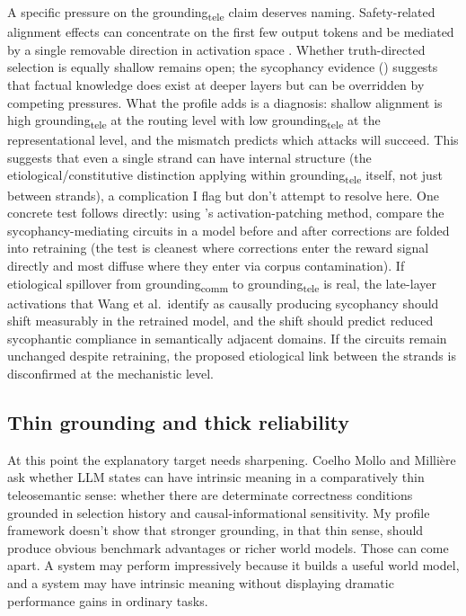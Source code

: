 \documentclass[12pt]{article}
\newcommand{\gtele}{grounding\textsubscript{tele}}
\newcommand{\gcomm}{grounding\textsubscript{comm}}
\begin{document}
A specific pressure on the \gtele{} claim deserves naming. Safety-related alignment effects can concentrate on the first few output tokens and be mediated by a single removable direction in activation space \citep{qi_2025_shallow_safety_alignment,arditi_2024_refusal_single_direction}. Whether truth-directed selection is equally shallow remains open; the sycophancy evidence (\citealt{wang_2025_truth_overridden_sycophancy}) suggests that factual knowledge does exist at deeper layers but can be overridden by competing pressures. What the profile adds is a diagnosis: shallow alignment is high \gtele{} at the routing level with low \gtele{} at the representational level, and the mismatch predicts which attacks will succeed. This suggests that even a single strand can have internal structure (the etiological/constitutive distinction applying within \gtele{} itself, not just between strands), a complication I flag but don't attempt to resolve here. One concrete test follows directly: using \textcite{wang_2025_truth_overridden_sycophancy}'s activation-patching method, compare the sycophancy-mediating circuits in a model before and after corrections are folded into retraining (the test is cleanest where corrections enter the reward signal directly and most diffuse where they enter via corpus contamination). If etiological spillover from \gcomm{} to \gtele{} is real, the late-layer activations that Wang et al.\ identify as causally producing sycophancy should shift measurably in the retrained model, and the shift should predict reduced sycophantic compliance in semantically adjacent domains. If the circuits remain unchanged despite retraining, the proposed etiological link between the strands is disconfirmed at the mechanistic level.

\subsection{Thin grounding and thick reliability}
\label{sec:thin-thick}

At this point the explanatory target needs sharpening. Coelho Mollo and Milli\`ere ask whether LLM states can have intrinsic meaning in a comparatively thin teleosemantic sense: whether there are determinate correctness conditions grounded in selection history and causal-informational sensitivity. My profile framework doesn't show that stronger grounding, in that thin sense, should produce obvious benchmark advantages or richer world models. Those can come apart. A system may perform impressively because it builds a useful world model, and a system may have intrinsic meaning without displaying dramatic performance gains in ordinary tasks.
\end{document}
